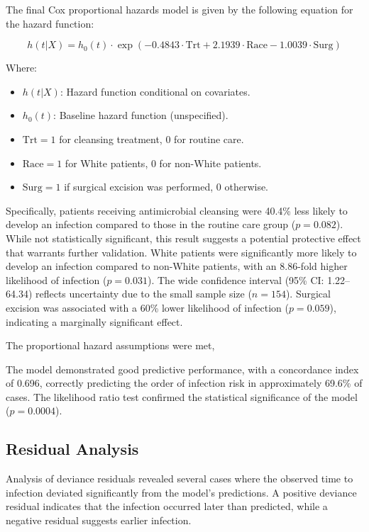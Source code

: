 \documentclass[12pt]{article}
\begin{document}
The final Cox proportional hazards model is given by the following equation for the hazard function:

\[
h(t | X) = h_0(t) \cdot \exp\left(-0.4843 \cdot \text{Trt} + 2.1939 \cdot \text{Race} - 1.0039 \cdot \text{Surg}\right)
\]

Where:
\begin{itemize}
    \item \( h(t | X) \): Hazard function conditional on covariates.
    \item \( h_0(t) \): Baseline hazard function (unspecified).
    \item \(\text{Trt} = 1\) for cleansing treatment, \(0\) for routine care.
    \item \(\text{Race} = 1\) for White patients, \(0\) for non-White patients.
    \item \(\text{Surg} = 1\) if surgical excision was performed, \(0\) otherwise.
\end{itemize}

Specifically, patients receiving antimicrobial cleansing were 40.4\% less likely to develop an infection compared to those in the routine care group (\(p = 0.082\)). While not statistically significant, this result suggests a potential protective effect that warrants further validation. White patients were significantly more likely to develop an infection compared to non-White patients, with an 8.86-fold higher likelihood of infection (\(p = 0.031\)). The wide confidence interval (95\% CI: 1.22–64.34) reflects uncertainty due to the small sample size (\(n = 154\)). Surgical excision was associated with a 60\% lower likelihood of infection (\(p = 0.059\)), indicating a marginally significant effect.

The proportional hazard assumptions were met, 



The model demonstrated good predictive performance, with a concordance index of 0.696, correctly predicting the order of infection risk in approximately 69.6\% of cases. The likelihood ratio test confirmed the statistical significance of the model (\(p = 0.0004\)).

\subsection*{Residual Analysis}

Analysis of deviance residuals revealed several cases where the observed time to infection deviated significantly from the model’s predictions. A positive deviance residual indicates that the infection occurred later than predicted, while a negative residual suggests earlier infection.
\end{document}
